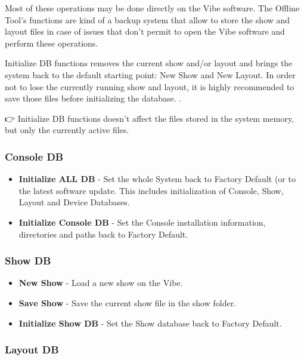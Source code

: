 \documentclass[
]{article}
\begin{document}
Most of these operations may be done directly on the Vibe software. The Offline Tool's functions are kind of a backup system that allow to store the show and layout files in case of issues that don't permit to open the Vibe software and perform these operations.

{ Initialize DB functions removes the current show and/or layout and brings the system back to the default starting point: New Show and New Layout. In order not to lose the currently running show and layout, it is highly recommended to save those files before initializing the database. }.

👉 Initialize DB functions doesn't affect the files stored in the system memory, but only the currently active files.

\hypertarget{console-db}{%
\subsubsection{Console DB}\label{console-db}}

\begin{itemize}
\item
  \textbf{Initialize ALL DB} - Set the whole System back to Factory Default (or to the latest software update. This includes initialization of Console, Show, Layout and Device Databases.
\item
  \textbf{Initialize Console DB} - Set the Console installation information, directories and paths back to Factory Default.
\end{itemize}

\hypertarget{show-db}{%
\subsubsection{Show DB}\label{show-db}}

\begin{itemize}
\item
  \textbf{New Show} - Load a new show on the Vibe.
\item
  \textbf{Save Show} - Save the current show file in the show folder.
\item
  \textbf{Initialize Show DB} - Set the Show database back to Factory Default.
\end{itemize}

\hypertarget{layout-db}{%
\subsubsection{Layout DB}\label{layout-db}}
\end{document}

